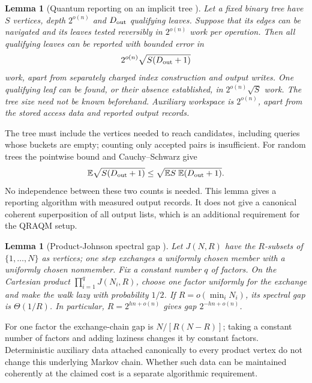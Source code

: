\documentclass[10pt,a4paper]{article}
\newtheorem{lemma}[theorem]{Lemma}
\theoremstyle{definition}
\begin{document}
\begin{lemma}[Quantum reporting on an implicit tree
  {\cite[Lemma~8.4]{HKKL}}]
\label{lem:tree-reporting}
Let a fixed binary tree have $S$ vertices, depth $2^{o(n)}$ and
$D_{\rm out}$ qualifying leaves. Suppose that its edges can be navigated
and its leaves tested reversibly in $2^{o(n)}$ work per operation.
Then all qualifying leaves can be reported with bounded error in
\[
 2^{o(n)}\sqrt{S(D_{\rm out}+1)}
\]
work, apart from separately charged index construction and output writes.
One qualifying leaf can be found, or their absence established, in
$2^{o(n)}\sqrt S$ work. The tree size need not be known beforehand.
Auxiliary workspace is $2^{o(n)}$, apart from the stored access data and
reported output records.
\end{lemma}
The tree must include the vertices needed to reach candidates, including
queries whose buckets are empty; counting only accepted pairs is
insufficient. For random trees the pointwise bound and Cauchy--Schwarz give
\[
 \mathbb E\sqrt{S(D_{\rm out}+1)}
 \leq\sqrt{\mathbb ES\;\mathbb E(D_{\rm out}+1)}.
\]
No independence between these two counts is needed. This lemma gives a
reporting algorithm with measured output records. It does not give a
canonical coherent superposition of all output lists, which is an
additional requirement for the QRAQM setup.

\begin{lemma}[Product-Johnson spectral gap
  {\cite[Definition~4 and Theorem~2]{BBSS}}]
\label{lem:johnson-gap}
Let $J(N,R)$ have the $R$-subsets of $\{1,\ldots,N\}$ as vertices;
one step exchanges a uniformly chosen member with a uniformly chosen
nonmember. Fix a constant number $q$ of factors. On the Cartesian product
$\prod_{i=1}^qJ(N_i,R)$, choose one factor uniformly for the exchange and
make the walk lazy with probability $1/2$.
If $R=o(\min_iN_i)$, its spectral gap is $\Theta(1/R)$.
In particular, $R=2^{hn+o(n)}$ gives gap $2^{-hn+o(n)}$.
\end{lemma}
For one factor the exchange-chain gap is $N/[R(N-R)]$; taking a constant
number of factors and adding laziness changes it by constant factors.
Deterministic auxiliary data attached canonically to every product vertex
do not change this underlying Markov chain. Whether such data can be
maintained coherently at the claimed cost is a separate algorithmic
requirement.
\end{document}

